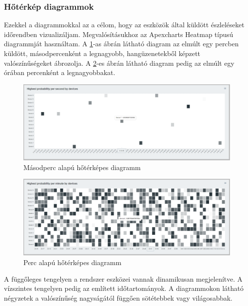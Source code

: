 \subsubsection{Hőtérkép diagrammok}
Ezekkel a diagrammokkal az a célom, hogy az eszközök által küldött észleléseket időrendben vizualizáljam.
Megvalósításukhoz az Apexcharts Heatmap típusú diagrammját használtam.
A \ref{fig:dashboard-heatmap-second}-as ábrán látható diagram az elmúlt egy percben küldött, másodpercenként a legnagyobb, hangüzenetekből képzett valószínűségeket ábrozolja.
A \ref{fig:dashboard-heatmap-minute}-es ábrán látható diagram pedig az elmúlt egy órában percenként a legnagyobbakat.
\begin{figure}[!ht]
    \centering
    \includegraphics[width=150mm, keepaspectratio]{figures/second-heatmap.png}
    \caption{Másodperc alapú hőtérképes diagramm}
    \label{fig:dashboard-heatmap-second}
\end{figure}
\begin{figure}[!ht]
    \centering
    \includegraphics[width=150mm, keepaspectratio]{figures/minute-heatmap.png}
    \caption{Perc alapú hőtérképes diagramm}
    \label{fig:dashboard-heatmap-minute}
\end{figure}

A függőleges tengelyen a rendszer eszközei vannak dinamikusan megjelenítve.
A vízszintes tengelyen pedig az említett időtartományok.
A diagrammokon látható négyzetek a valószínűség nagyságától függően sötétebbek vagy világosabbak.
\newpage
